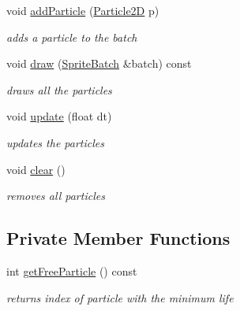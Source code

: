 \begin{DoxyCompactItemize}
\mbox{\label{classnta_1_1ParticleBatch2D_aeb80340cf60145569e7d30e5e25fd9c0}} 
void \hyperlink{classnta_1_1ParticleBatch2D_aeb80340cf60145569e7d30e5e25fd9c0}{add\+Particle} (\hyperlink{structnta_1_1Particle2D}{Particle2D} p)
\begin{DoxyCompactList}\small\item\em adds a particle to the batch \end{DoxyCompactList}\item 
\mbox{\label{classnta_1_1ParticleBatch2D_a270e573b2a767bf32fde34d17d838e69}} 
void \hyperlink{classnta_1_1ParticleBatch2D_a270e573b2a767bf32fde34d17d838e69}{draw} (\hyperlink{classnta_1_1SpriteBatch}{Sprite\+Batch} \&batch) const
\begin{DoxyCompactList}\small\item\em draws all the particles \end{DoxyCompactList}\item 
\mbox{\label{classnta_1_1ParticleBatch2D_a55d3f2b663039bb95e847f0770c864cf}} 
void \hyperlink{classnta_1_1ParticleBatch2D_a55d3f2b663039bb95e847f0770c864cf}{update} (float dt)
\begin{DoxyCompactList}\small\item\em updates the particles \end{DoxyCompactList}\item 
\mbox{\label{classnta_1_1ParticleBatch2D_a1046b22d239222435e74011b3683a5c6}} 
void \hyperlink{classnta_1_1ParticleBatch2D_a1046b22d239222435e74011b3683a5c6}{clear} ()
\begin{DoxyCompactList}\small\item\em removes all particles \end{DoxyCompactList}\end{DoxyCompactItemize}
\subsection*{Private Member Functions}
\begin{DoxyCompactItemize}
\item 
\mbox{\label{classnta_1_1ParticleBatch2D_a123aac9af29133bfe358b9895de2b2ce}} 
int \hyperlink{classnta_1_1ParticleBatch2D_a123aac9af29133bfe358b9895de2b2ce}{get\+Free\+Particle} () const
\begin{DoxyCompactList}\small\item\em returns index of particle with the minimum life \end{DoxyCompactList}\end{DoxyCompactItemize}
